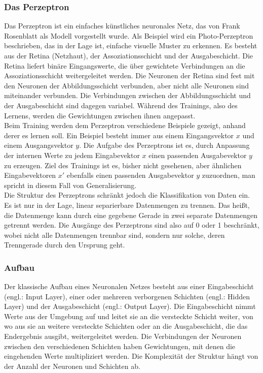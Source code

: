 \subsubsection{Das Perzeptron}
Das Perzeptron ist ein einfaches künstliches neuronales Netz, das von Frank Rosenblatt als Modell vorgestellt wurde. Als Beispiel wird ein Photo-Perzeptron beschrieben, das in der Lage ist, einfache visuelle Muster zu erkennen. Es besteht aus der Retina (Netzhaut), der Assoziationsschicht und der Ausgabeschicht. Die Retina liefert binäre Eingangswerte, die über gewichtete Verbindungen an die Assoziationsschicht weitergeleitet werden. Die Neuronen der Retina sind fest mit den Neuronen der Abbildungsschicht verbunden, aber nicht alle Neuronen sind miteinander verbunden. Die Verbindungen zwischen der Abbildungsschicht und der Ausgabeschicht sind dagegen variabel. Während des Trainings, also des Lernens, werden die Gewichtungen zwischen ihnen angepasst. \\
Beim Training werden dem Perzeptron verschiedene Beispiele gezeigt, anhand derer es lernen soll. Ein Beispiel besteht immer aus einem Eingangsvektor $x$ und einem Ausgangsvektor $y$. Die Aufgabe des Perzeptrons ist es, durch Anpassung der internen Werte zu jedem Eingabevektor $x$ einen passenden Ausgabevektor $y$ zu erzeugen. Ziel des Trainings ist es, bisher nicht gesehenen, aber ähnlichen Eingabevektoren $x'$ ebenfalls einen passenden Ausgabevektor $y$ zuzuordnen, man spricht in diesem Fall von Generalisierung. \cite[vgl.][]{Scherer1997} \\
Die Struktur des Perzeptrons schränkt jedoch die Klassifikation von Daten ein. Es ist nur in der Lage, linear separierbare Datenmengen zu trennen. Das heißt, die Datenmenge kann durch eine gegebene Gerade in zwei separate Datenmengen getrennt werden. Die Ausgänge des Perzeptrons sind also auf 0 oder 1 beschränkt, wobei nicht alle Datenmengen trennbar sind, sondern nur solche, deren Trenngerade durch den Ursprung geht.\cite{Ertel2021}

\subsubsection{Aufbau}
Der klassische Aufbau eines Neuronalen Netzes besteht aus einer Eingabeschicht (engl.: Input Layer), einer oder mehreren verborgenen Schichten (engl.: Hidden Layer) und der Ausgabeschicht (engl.: Output Layer). Die Eingabeschicht nimmt Werte aus der Umgebung auf und leitet sie an die versteckte Schicht weiter, von wo aus sie an weitere versteckte Schichten oder an die Ausgabeschicht, die das Endergebnis ausgibt, weitergeleitet werden. Die Verbindungen der Neuronen zwischen den verschiedenen Schichten haben Gewichtungen, mit denen die eingehenden Werte multipliziert werden. Die Komplexität der Struktur hängt von der Anzahl der Neuronen und Schichten ab. \cite[vgl.][]{Frochte2020}


